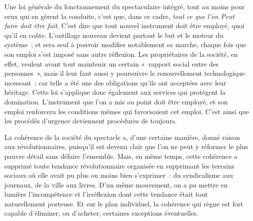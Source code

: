 \documentclass[french,twoside]{book} %
\def\mednobreak{\ifdim\lastskip<\medskipamount
  \removelastskip\nopagebreak\medskip\fi}
\newcommand{\labelblock}[1]{\medbreak{\noindent\color{rubric}\bfseries #1}\par\mednobreak}
\begin{document}
\labelblock{XXIX}

\noindent Une loi générale du fonctionnement du spectaculaire intégré, tout au moins pour ceux qui en gèrent la conduite, c’est que, dans ce cadre, \emph{tout ce que l’on Peut faire doit être fait}. C’est dire que tout nouvel instrument doit être employé, quoi qu’il en coûte. L’outillage nouveau devient partout le but et le moteur du système ; et sera seul à pouvoir modifier notablement sa marche, chaque fois que son emploi s’est imposé sans autre réflexion. Les propriétaires de la société, en effet, veulent avant tout maintenir un certain « rapport social entre des personnes », mais il leur faut aussi y poursuivre le renouvellement technologique incessant ; car telle a été une des obligations qu’ils ont acceptées avec leur héritage. Cette loi s’applique donc également aux services qui protègent la domination. L’instrument que l’on a mis au point doit être employé, et son emploi renforcera les conditions mêmes qui favorisaient cet emploi. C’est ainsi que les procédés d’urgence deviennent procédures de toujours.\par
La cohérence de la société du spectacle a, d’une certaine manière, donné raison aux révolutionnaires, puisqu’il est devenu clair que l’on ne peut y réformer le plus pauvre détail sans défaire l’ensemble. Mais, en même temps, cette cohérence a supprimé toute tendance révolutionnaire organisée en supprimant les terrains sociaux où elle avait pu plus ou moins bien s’exprimer : du syndicalisme aux journaux, de la ville aux livres. D’un même mouvement, on a pu mettre en lumière l’incompétence et l’irréflexion dont cette tendance était tout naturellement porteuse. Et sur le plan individuel, la cohérence qui règne est fort capable d’éliminer, ou d’acheter, certaines exceptions éventuelles.\par

\labelblock{XXX}
\end{document}
